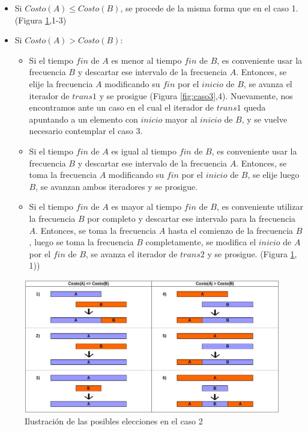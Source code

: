 \begin{itemize}
\item Si $Costo(A) \leq Costo(B)$, se procede de la misma forma que en el caso 1. (Figura \ref{fig:caso2},1-3)
\item Si $Costo(A) > Costo(B)$:
	\begin{itemize}
	\item Si el tiempo $fin$ de $A$ es menor al tiempo $fin$ de $B$, es conveniente usar la frecuencia $B$ y descartar ese intervalo de la frecuencia $A$.  Entonces, se elije la frecuencia $A$ modificando su $fin$ por el $inicio$ de $B$, se avanza el iterador de $trans1$ y se prosigue (Figura \ref{fig:caso3},4).  Nuevamente, nos encontramos ante un caso en el cual el iterador de $trans1$ queda apuntando a un elemento con $inicio$ mayor al $inicio$ de $B$, y se vuelve necesario contemplar el caso 3.
	\item Si el tiempo $fin$ de $A$ es igual al tiempo $fin$ de $B$, es conveniente usar la frecuencia $B$ y descartar ese intervalo de la frecuencia $A$.  Entonces, se toma la frecuencia $A$ modificando su $fin$ por el $inicio$ de $B$, se elije luego $B$, se avanzan ambos iteradores y se prosigue.
	\item Si el tiempo $fin$ de $A$ es mayor al tiempo $fin$ de $B$, es conveniente utilizar la frecuencia $B$ por completo y descartar ese intervalo para la frecuencia $A$. Entonces, se toma la frecuencia $A$ hasta el comienzo de la frecuencia $B$, luego se toma la frecuencia $B$ completamente, se modifica el $inicio$ de $A$ por el $fin$ de $B$, se avanza el iterador de $trans2$ y se prosigue. (Figura \ref{fig:caso2}, 1))
	\end{itemize}
\end{itemize}

\begin{figure}[htb]
  \begin{center}
      \includegraphics[scale=0.5]{imagenes/caso2.jpeg}
  \end{center}
  \caption{Ilustración de las posibles elecciones en el caso 2}\label{fig:caso2}
\end{figure}

